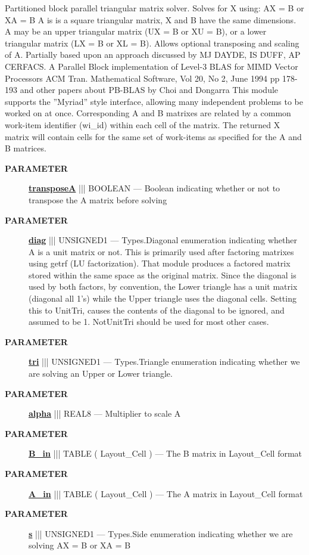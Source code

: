 Partitioned block parallel triangular matrix solver. Solves for X using: AX = B or XA = B A is is a square triangular matrix, X and B have the same dimensions. A may be an upper triangular matrix (UX = B or XU = B), or a lower triangular matrix (LX = B or XL = B). Allows optional transposing and scaling of A. Partially based upon an approach discussed by MJ DAYDE, IS DUFF, AP CERFACS. A Parallel Block implementation of Level-3 BLAS for MIMD Vector Processors ACM Tran. Mathematical Software, Vol 20, No 2, June 1994 pp 178-193 and other papers about PB-BLAS by Choi and Dongarra This module supports the ''Myriad'' style interface, allowing many independent problems to be worked on at once. Corresponding A and B matrixes are related by a common work-item identifier (wi\_id) within each cell of the matrix. The returned X matrix will contain cells for the same set of work-items as specified for the A and B matrices.






\par
\begin{description}
\item [\colorbox{tagtype}{\color{white} \textbf{\textsf{PARAMETER}}}] \textbf{\underline{transposeA}} ||| BOOLEAN --- Boolean indicating whether or not to transpose the A matrix before solving
\item [\colorbox{tagtype}{\color{white} \textbf{\textsf{PARAMETER}}}] \textbf{\underline{diag}} ||| UNSIGNED1 --- Types.Diagonal enumeration indicating whether A is a unit matrix or not. This is primarily used after factoring matrixes using getrf (LU factorization). That module produces a factored matrix stored within the same space as the original matrix. Since the diagonal is used by both factors, by convention, the Lower triangle has a unit matrix (diagonal all 1's) while the Upper triangle uses the diagonal cells. Setting this to UnitTri, causes the contents of the diagonal to be ignored, and assumed to be 1. NotUnitTri should be used for most other cases.
\item [\colorbox{tagtype}{\color{white} \textbf{\textsf{PARAMETER}}}] \textbf{\underline{tri}} ||| UNSIGNED1 --- Types.Triangle enumeration indicating whether we are solving an Upper or Lower triangle.
\item [\colorbox{tagtype}{\color{white} \textbf{\textsf{PARAMETER}}}] \textbf{\underline{alpha}} ||| REAL8 --- Multiplier to scale A
\item [\colorbox{tagtype}{\color{white} \textbf{\textsf{PARAMETER}}}] \textbf{\underline{B\_in}} ||| TABLE ( Layout\_Cell ) --- The B matrix in Layout\_Cell format
\item [\colorbox{tagtype}{\color{white} \textbf{\textsf{PARAMETER}}}] \textbf{\underline{A\_in}} ||| TABLE ( Layout\_Cell ) --- The A matrix in Layout\_Cell format
\item [\colorbox{tagtype}{\color{white} \textbf{\textsf{PARAMETER}}}] \textbf{\underline{s}} ||| UNSIGNED1 --- Types.Side enumeration indicating whether we are solving AX = B or XA = B
\end{description}







